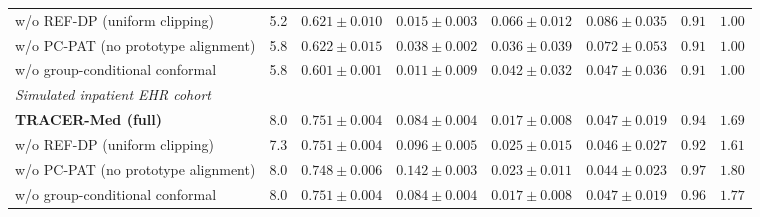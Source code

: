 \documentclass[pdflatex,sn-vancouver-num,referee,lineno]{sn-jnl}
\theoremstyle{thmstyleone}
\theoremstyle{thmstylethree}
\begin{document}
\begin{table}
\begin{tabular}{lccccccc}
\quad w/o REF-DP (uniform clipping) & 5.2 & $0.621 \pm 0.010$ & $0.015 \pm 0.003$ & $0.066 \pm 0.012$ & $0.086 \pm 0.035$ & $0.91$ & $1.00$ \\
\quad w/o PC-PAT (no prototype alignment) & 5.8 & $\mathbf{0.622} \pm \mathbf{0.015}$ & $0.038 \pm 0.002$ & $\mathbf{0.036} \pm \mathbf{0.039}$ & $0.072 \pm 0.053$ & $0.91$ & $1.00$ \\
\quad w/o group-conditional conformal & 5.8 & $0.601 \pm 0.001$ & $\mathbf{0.011} \pm \mathbf{0.009}$ & $0.042 \pm 0.032$ & $\mathbf{0.047} \pm \mathbf{0.036}$ & $0.91$ & $1.00$ \\
\midrule
\multicolumn{8}{l}{\emph{Simulated inpatient EHR cohort}} \\
\textbf{TRACER-Med (full)} & 8.0 & $\mathbf{0.751} \pm \mathbf{0.004}$ & $\mathbf{0.084} \pm \mathbf{0.004}$ & $\mathbf{0.017} \pm \mathbf{0.008}$ & $0.047 \pm 0.019$ & $0.94$ & $1.69$ \\
\quad w/o REF-DP (uniform clipping) & 7.3 & $0.751 \pm 0.004$ & $0.096 \pm 0.005$ & $0.025 \pm 0.015$ & $0.046 \pm 0.027$ & $0.92$ & $1.61$ \\
\quad w/o PC-PAT (no prototype alignment) & 8.0 & $0.748 \pm 0.006$ & $0.142 \pm 0.003$ & $0.023 \pm 0.011$ & $\mathbf{0.044} \pm \mathbf{0.023}$ & $0.97$ & $1.80$ \\
\quad w/o group-conditional conformal & 8.0 & $\mathbf{0.751} \pm \mathbf{0.004}$ & $\mathbf{0.084} \pm \mathbf{0.004}$ & $\mathbf{0.017} \pm \mathbf{0.008}$ & $0.047 \pm 0.019$ & $0.96$ & $1.77$ \\
\bottomrule
\end{tabular}
\endgroup
\par\vspace{3pt}
\end{table}
\end{document}
